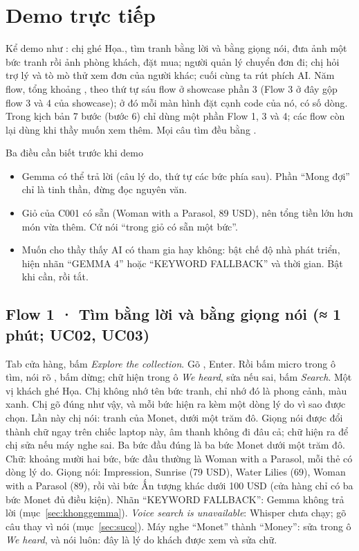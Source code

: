 \section{Demo trực tiếp}\label{sec:demo}
Kể demo như : chị ghé Họa., tìm tranh bằng lời và bằng giọng nói, đưa ảnh một bức tranh rồi ảnh phòng khách, đặt mua; người quản lý chuyển đơn đi; chị hỏi trợ lý và tò mò thử xem đơn của người khác; cuối cùng ta rút phích AI. Năm flow, tổng khoảng , theo thứ tự sáu flow ở showcase phần 3 (Flow 3 ở đây gộp flow 3 và 4 của showcase); ở đó mỗi màn hình đặt cạnh code của nó, có số dòng. Trong kịch bản 7 bước (bước 6) chỉ dùng một phần Flow 1, 3 và 4; các flow còn lại dùng khi thầy muốn xem thêm. Mọi câu tìm đều bằng .

\begin{note}[warn]{Ba điều cần biết trước khi demo}
\begin{itemize}
\item Gemma có thể trả lời  (câu lý do, thứ tự các bức phía sau). Phần ``Mong đợi'' chỉ là tinh thần, đừng đọc nguyên văn.
\item Giỏ của C001 có sẵn  (Woman with a Parasol, 89 USD), nên tổng tiền lớn hơn món vừa thêm. Cứ nói ``trong giỏ có sẵn một bức''.
\item Muốn cho thầy thấy AI có tham gia hay không:  bật chế độ nhà phát triển, hiện nhãn ``GEMMA 4'' hoặc ``KEYWORD FALLBACK'' và thời gian. Bật khi cần, rồi tắt.
\end{itemize}
\end{note}

\subsection{Flow 1 · Tìm bằng lời và bằng giọng nói \normalfont\small(≈ 1 phút; UC02, UC03)}
Tab cửa hàng, bấm \emph{Explore the collection}. Gõ , Enter. Rồi bấm micro trong ô tìm, nói rõ , bấm dừng; chữ hiện trong ô \emph{We heard}, sửa nếu sai, bấm \emph{Search}.
Một vị khách ghé Họa. Chị không nhớ tên bức tranh, chỉ nhớ đó là phong cảnh, màu xanh. Chị gõ đúng như vậy, và mỗi bức hiện ra kèm một dòng lý do vì sao được chọn.  Lần này chị nói: tranh của Monet, dưới một trăm đô. Giọng nói được đổi thành chữ ngay trên chiếc laptop này, âm thanh không đi đâu cả; chữ hiện ra để chị sửa nếu máy nghe sai. Ba bức đầu đúng là ba bức Monet dưới một trăm đô.
Chữ: khoảng mười hai bức, bức đầu thường là Woman with a Parasol, mỗi thẻ có dòng lý do. Giọng nói: Impression, Sunrise (79 USD), Water Lilies (69), Woman with a Parasol (89), rồi vài bức Ấn tượng khác dưới 100 USD (cửa hàng chỉ có ba bức Monet đủ điều kiện).
Nhãn ``KEYWORD FALLBACK'': Gemma không trả lời (mục~\ref{sec:khonggemma}). \emph{Voice search is unavailable}: Whisper chưa chạy; gõ câu thay vì nói (mục~\ref{sec:suco}). Máy nghe ``Monet'' thành ``Money'': sửa trong ô \emph{We heard}, và nói luôn: đây là lý do khách được xem và sửa chữ.

